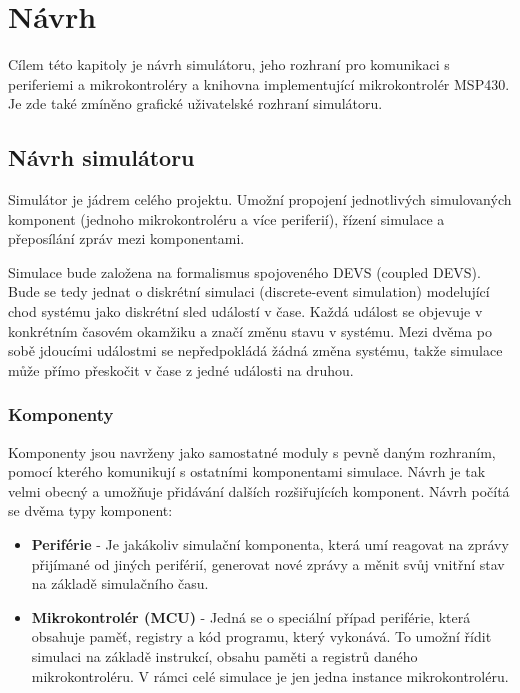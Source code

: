 \chapter{Návrh}
\label{navrh}

Cílem této kapitoly je návrh simulátoru, jeho rozhraní pro komunikaci s periferiemi a mikrokontroléry a knihovna implementující mikrokontrolér MSP430.
Je zde také zmíněno grafické uživatelské rozhraní simulátoru.

\section{Návrh simulátoru}

Simulátor je jádrem celého projektu. Umožní propojení jednotlivých simulovaných komponent (jednoho mikrokontroléru a více periferií), řízení simulace
a přeposílání zpráv mezi komponentami.

Simulace bude založena na formalismus spojoveného DEVS (coupled DEVS). Bude se tedy jednat o diskrétní simulaci (discrete-event simulation) 
modelující chod systému jako diskrétní sled událostí v čase. Každá událost se objevuje v konkrétním časovém okamžiku a značí změnu stavu v systému.
Mezi dvěma po sobě jdoucími událostmi se nepředpokládá žádná změna systému, takže simulace může přímo přeskočit v čase z jedné události na druhou.

\subsection{Komponenty}

Komponenty jsou navrženy jako samostatné moduly s pevně daným rozhraním, pomocí kterého komunikují s ostatními komponentami simulace. Návrh je
tak velmi obecný a umožňuje přidávání dalších rozšiřujících komponent.
Návrh počítá se dvěma typy komponent:

\begin{itemize}
\item \textbf{Periférie} - Je jakákoliv simulační komponenta, která umí reagovat na zprávy přijímané od jiných periférií, generovat nové zprávy a měnit svůj vnitřní stav
na základě simulačního času.
\item \textbf{Mikrokontrolér (MCU)} - Jedná se o speciální případ periférie, která obsahuje paměť, registry a kód programu, který vykonává.
To umožní řídit simulaci na základě instrukcí, obsahu paměti a registrů daného mikrokontroléru.  V rámci celé simulace je jen jedna instance mikrokontroléru. 
\end{itemize}

